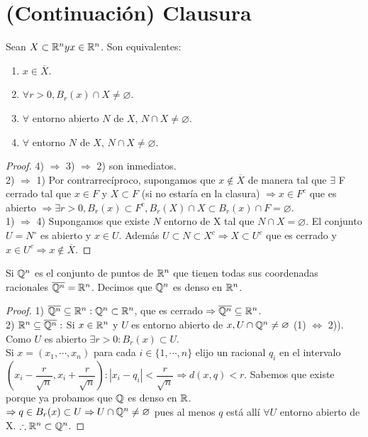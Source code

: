 \section{(Continuación) Clausura}

\begin{prop}
  Sean $X \subset \mathbb{R}^n y x \in \mathbb{R}^n$. Son equivalentes:
  \begin{enumerate}
    \item $x \in \overline{X}$.
    \item $\forall r > 0, B_r(x) \cap X \neq \varnothing$.
    \item $\forall$ entorno abierto $N$ de $X$, $N \cap X \neq \varnothing$.
    \item $\forall$ entorno $N$ de $X$, $N \cap X \neq \varnothing$.
  \end{enumerate}

  \begin{proof}
    4) $\Rightarrow$ 3) $\Rightarrow$ 2) son inmediatos. \\
    2) $\Rightarrow$ 1) Por contrarrecíproco, supongamos que $x \notin \overline{X}$ de manera tal que $\exists$ F cerrado tal que $x \in F$ y $X \subset F$ (si no estaría en la clasura) $\Rightarrow x \in F^c$ que es abierto $\Rightarrow \exists r > 0, B_r(x) \subset F^c, B_r(X) \cap X \subset B_r(x) \cap F = \varnothing$. \\
    1) $\Rightarrow$ 4) Supongamos que existe $N$ entorno de X tal que $N \cap X = \varnothing$. El conjunto $U = N^{\circ}$ es abierto y $x \in U$. Además $U \subset N \subset X^c \Rightarrow X \subset U^c$ que es cerrado y $x \in U^c \Rightarrow x \notin \overline{X}$.
  \end{proof}
\end{prop}

\begin{eg}
  Si $\mathbb{Q}^n$ es el conjunto de puntos de $\mathbb{R}^n$ que tienen todas sus coordenadas racionales $\overline{\mathbb{Q}^n} = \mathbb{R}^n$. Decimos que $\mathbb{Q}^n$ es denso en $\mathbb{R}^n$.

  \begin{proof}
    1) $\overline{\mathbb{Q}^n} \subseteq \mathbb{R}^n : \mathbb{Q}^n \subset \mathbb{R}^n$, que es cerrado $\Rightarrow \overline{\mathbb{Q}^n} \subseteq \mathbb{R}^n$. \\
    2) $\mathbb{R}^n \subseteq \overline{\mathbb{Q}^n}:$ Si $x \in \mathbb{R}^n$ y $U$ es entorno abierto de $x, U \cap \mathbb{Q}^n \neq \varnothing$ (1) $\iff$ 2)). Como $U$ es abierto $\exists r > 0 : B_r(x) \subset U$. \\
    Si $x = (x_1, \cdots, x_n)$ para cada $i \in \{1, \cdots, n\}$ elijo un racional $q_i$ en el intervalo $(x_i - \dfrac{r}{\sqrt{n}}, x_i + \dfrac{r}{\sqrt{n}}) : |x_i - q_i| < \dfrac{r}{\sqrt{n}} \Rightarrow d(x, q) < r$. Sabemos que existe porque ya probamos que $\mathbb{Q}$ es denso en $\mathbb{R}$. \\
    $\Rightarrow q \in B_r(x) \subset U \Rightarrow U \cap \mathbb{Q}^n \neq \varnothing$ pues al menos $q$ está allí $\forall U$ entorno abierto de X.
    $\therefore \mathbb{R}^n \subset \mathbb{Q}^n$.
  \end{proof}
\end{eg}

